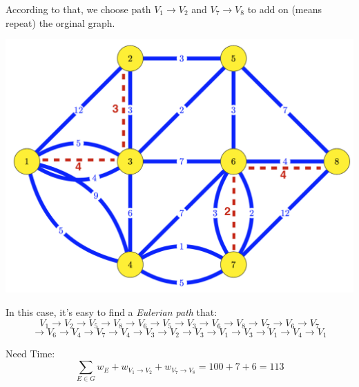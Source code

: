 \documentclass{article}
\begin{document}
{{        According to that, we choose path \(\mathit{V}_{\mathrm{1}} \to \mathit{V}_{\mathrm{2}}\) and \(\mathit{V}_{\mathrm{7}} \to \mathit{V}_{\mathrm{8}}\) to add on (means repeat) the orginal graph.

        \begin{center}{
            \includegraphics[scale=0.6]{P10_2.png}
        }
        \end{center}

        In this case, it's easy to find a \textit{Eulerian path} that:
        \[\mathit{V}_{\mathrm{1}} \to \mathit{V}_{\mathrm{2}} \to \mathit{V}_{\mathrm{5}} \to \mathit{V}_{\mathrm{8}} \to \mathit{V}_{\mathrm{6}} \to \mathit{V}_{\mathrm{5}} \to \mathit{V}_{\mathrm{3}} \to \mathit{V}_{\mathrm{6}} \to \mathit{V}_{\mathrm{8}} \to \mathit{V}_{\mathrm{7}} \to \mathit{V}_{\mathrm{6}} \to \mathit{V}_{\mathrm{7}}\]
        \[\to \mathit{V}_{\mathrm{6}} \to \mathit{V}_{\mathrm{4}} \to \mathit{V}_{\mathrm{7}} \to \mathit{V}_{\mathrm{4}} \to \mathit{V}_{\mathrm{3}} \to \mathit{V}_{\mathrm{2}} \to \mathit{V}_{\mathrm{3}} \to \mathit{V}_{\mathrm{1}} \to \mathit{V}_{\mathrm{3}} \to \mathit{V}_{\mathrm{1}} \to \mathit{V}_{\mathrm{4}} \to \mathit{V}_{\mathrm{1}}\]

        Need Time: \[\sum_{\mathit{E}\in\mathit{G}}\mathit{w_E} + \mathit{w}_{\mathit{V}_{\mathrm{1}} \to \mathit{V}_{\mathrm{2}}} + \mathit{w}_{\mathit{V}_{\mathrm{7}} \to \mathit{V}_{\mathrm{8}}} = \mathrm{100 + 7 + 6 = 113}\]
    }

}
\end{document}
